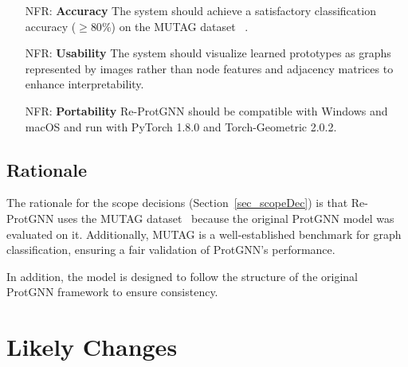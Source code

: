 \documentclass[12pt]{article}
\newcounter{nfrnum} %
\begin{document}
\noindent \begin{itemize}

\item[NFR\refstepcounter{nfrnum}\thenfrnum \label{NFR_Accuracy}:]
  \textbf{Accuracy} The system should achieve a satisfactory classification accuracy ($\geq80\%$) on the MUTAG dataset ~\cite{debnath1991structure}.

\item[NFR\refstepcounter{nfrnum}\thenfrnum \label{NFR_Usability}:] \textbf{Usability}
  The system should visualize learned prototypes as graphs represented by images rather than node features and adjacency matrices to enhance interpretability.


\item[NFR\refstepcounter{nfrnum}\thenfrnum \label{NFR_Portability}:]
  \textbf{Portability} Re-ProtGNN should be compatible with Windows and macOS and run with PyTorch 1.8.0 and Torch-Geometric 2.0.2.
  

\end{itemize}


\subsection{Rationale}

The rationale for the scope decisions (Section~\ref{sec_scopeDec}) is that Re-ProtGNN uses the MUTAG dataset~\cite{debnath1991structure} because the original ProtGNN model was evaluated on it. Additionally, MUTAG is a well-established benchmark for graph classification, ensuring a fair validation of ProtGNN's performance.

In addition, the model is designed to follow the structure of the original ProtGNN framework to ensure consistency.


\section{Likely Changes}    
\end{document}
